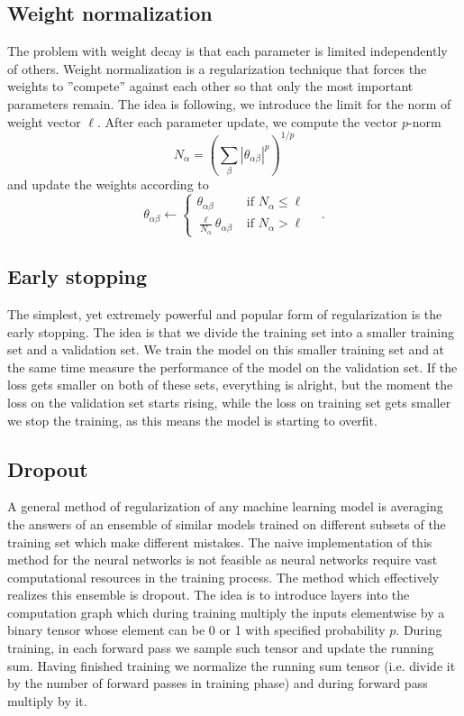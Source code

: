 \documentclass{myclass}
\begin{document}
\subsection{Weight normalization}

The problem with weight decay is that each parameter is limited independently of others. Weight
normalization is a regularization technique that forces the weights to ''compete'' against each
other so that only the most important parameters remain. The idea is following, we introduce the
limit for the norm of weight vector \(\ell\). After each parameter update, we compute the vector
\(p\)-norm
\[
   N_{\alpha} = \left( \sum_{\beta} \left|\theta_{\alpha\beta}\right|^p \right)^{1/p}
\]
and update the weights according to
\[
   \theta_{\alpha\beta} \gets \begin{cases} 
                           \theta_{\alpha\beta}                            &\text{ if \(N_\alpha \leq \ell\)}\\
                           \frac{\ell}{N_\alpha} \theta_{\alpha\beta}   &\text{ if \(N_\alpha > \ell\)}
   \end{cases}\quad.
\]


\subsection{Early stopping}

The simplest, yet extremely powerful and popular form of regularization is the early stopping. The
idea is that we divide the training set into a smaller training set and a validation set. We train
the model on this smaller training set and at the same time measure the performance of the model on
the validation set. If the loss gets smaller on both of these sets, everything is alright, but the
moment the loss on the validation set starts rising, while the loss on training set gets smaller we
stop the training, as this means the model is starting to overfit.


\subsection{Dropout}

A general method of regularization of any machine learning model is averaging the answers of an
ensemble of similar models trained on different subsets of the training set which make different
mistakes. The naive implementation of this method for the neural networks is not feasible as neural
networks require vast computational resources in the training process. The method which effectively
realizes this ensemble is dropout. The idea is to introduce layers into the computation graph which
during training multiply the inputs elementwise by a binary tensor whose element can be 0 or 1 with
specified probability \(p\). During training, in each forward pass we sample such tensor and update
the running sum. Having finished training we normalize the running sum tensor (i.e. divide it by the
number of forward passes in training phase) and during forward pass multiply by it.
\end{document}
